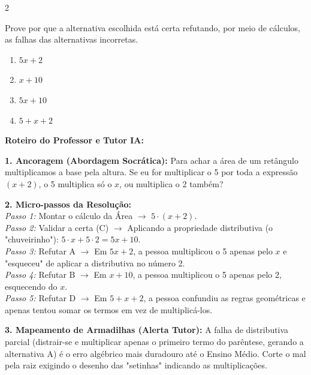 \begin{multicols*}{2}
\begin{enunciadoLiteral}
Prove por que a alternativa escolhida está certa refutando, por meio de cálculos, as falhas das alternativas incorretas.

\begin{enumerate}[label=\alph*), itemsep=\espacoAlt]
    \item $ 5x + 2 $
    \item $ x + 10 $
    \item $ 5x + 10 $
    \item $ 5 + x + 2 $
\end{enumerate}
\end{enunciadoLiteral}

\ifgabarito
    \begin{tcolorbox}[colback=CorTitUm!5, colframe=CorTitUm, boxrule=1pt, arc=4pt, left=6pt, right=6pt, top=6pt, bottom=6pt]
    \small\textbf{\textcolor{CorTitUm}{Roteiro do Professor e Tutor IA:}}\par\vspace{0.1cm}
    \color{CinzaEscuro}
    \textbf{1. Ancoragem (Abordagem Socrática):} Para achar a área de um retângulo multiplicamos a base pela altura. Se eu for multiplicar o 5 por toda a expressão $(x+2)$, o 5 multiplica só o $x$, ou multiplica o 2 também?\par\vspace{0.1cm}
    
    \textbf{2. Micro-passos da Resolução:}\\
    \textit{Passo 1:} Montar o cálculo da Área $\rightarrow$ $ 5 \cdot (x + 2) $.\\
    \textit{Passo 2:} Validar a certa (C) $\rightarrow$ Aplicando a propriedade distributiva (o "chuveirinho"): $5 \cdot x + 5 \cdot 2 = 5x + 10$.\\
    \textit{Passo 3:} Refutar A $\rightarrow$ Em $5x + 2$, a pessoa multiplicou o 5 apenas pelo $x$ e "esqueceu" de aplicar a distributiva no número 2.\\
    \textit{Passo 4:} Refutar B $\rightarrow$ Em $x + 10$, a pessoa multiplicou o 5 apenas pelo 2, esquecendo do $x$.\\
    \textit{Passo 5:} Refutar D $\rightarrow$ Em $5 + x + 2$, a pessoa confundiu as regras geométricas e apenas tentou somar os termos em vez de multiplicá-los.\par\vspace{0.1cm}
    
    \textbf{3. Mapeamento de Armadilhas (Alerta Tutor):} A falha de distributiva parcial (distrair-se e multiplicar apenas o primeiro termo do parêntese, gerando a alternativa A) é o erro algébrico mais duradouro até o Ensino Médio. Corte o mal pela raiz exigindo o desenho das "setinhas" indicando as multiplicações.
    \end{tcolorbox}
    \vspace{0.15cm}
    

\end{multicols*}
